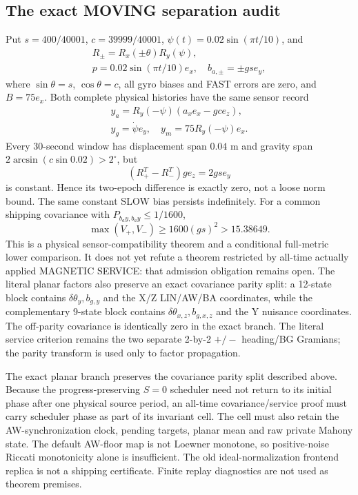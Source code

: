 \documentclass[journal]{IEEEtran}
\begin{document}
\subsection{The exact MOVING separation audit}
Put \(s=400/40001\), \(c=39999/40001\),
\(\psi(t)=0.02\sin(\pi t/10)\), and
\[
\begin{gathered}
R_\pm=R_x(\pm\theta)R_y(\psi),\\
p=0.02\sin(\pi t/10)e_x,\quad b_{a,\pm}=\pm gs e_y,
\end{gathered}
\]
where \(\sin\theta=s\), \(\cos\theta=c\), all gyro biases and FAST errors
are zero, and \(B=75e_x\). Both complete physical histories have the same
sensor record
\[
\begin{gathered}
y_a=R_y(-\psi)(a_xe_x-gce_z),\\
y_g=\dot\psi e_y,\quad y_m=75R_y(-\psi)e_x.
\end{gathered}
\]
Every 30-second window has displacement span \(0.04\) m and gravity span
\(2\arcsin(c\sin0.02)>2^\circ\), but
\[
(R_+^T-R_-^T)ge_z=2gs e_y
\]
is constant. Hence its two-epoch difference is exactly zero, not a loose
norm bound. The same constant SLOW bias persists indefinitely.
For a common shipping covariance with \(P_{b_ay,b_ay}\le1/1600\),
\[
\max(V_+,V_-)\ge1600(gs)^2>15.38649.
\]
This is a physical sensor-compatibility theorem and a conditional full-metric
lower comparison. It does not yet refute a theorem restricted by all-time
actually applied MAGNETIC SERVICE: that admission obligation remains open.
The literal planar factors also preserve an exact covariance parity split:
a 12-state block contains \(\delta\theta_y,b_{g,y}\) and the X/Z
LIN/AW/BA coordinates, while the complementary 9-state block contains
\(\delta\theta_{x,z},b_{g,x,z}\) and the Y nuisance coordinates.  The
off-parity covariance is identically zero in the exact branch.  The literal
service criterion remains the two separate 2-by-2 \(+/-\) heading/BG
Gramians; the parity transform is used only to factor propagation.

The exact planar branch preserves the covariance parity split described above.
Because the progress-preserving $S=0$ scheduler need not return to its initial
phase after one physical source period, an all-time covariance/service proof
must carry scheduler phase as part of its invariant cell.  The cell must also retain the AW-synchronization clock, pending targets,
planar mean and raw private Mahony state. The default AW-floor map is not
Loewner monotone, so positive-noise Riccati monotonicity alone is insufficient.
The old ideal-normalization frontend replica is not a shipping certificate.
Finite replay diagnostics are not used as theorem premises.
\end{document}
